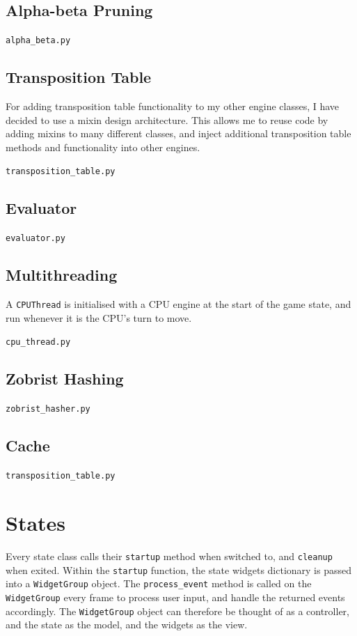 \documentclass[../main/main.tex]{subfiles}
\begin{document}
\subsection{Alpha-beta Pruning}
\label{sec:alpha-beta}
\noindent\verb|alpha_beta.py|


\subsection{Transposition Table}
\label{sec:transposition-table}
For adding transposition table functionality to my other engine classes, I have decided to use a mixin design architecture. This allows me to reuse code by adding mixins to many different classes, and inject additional transposition table methods and functionality into other engines.

\noindent\verb|transposition_table.py|


\subsection{Evaluator}
\noindent\verb|evaluator.py|


\subsection{Multithreading}
A \lstinline{CPUThread} is initialised with a CPU engine at the start of the game state, and run whenever it is the CPU's turn to move.

\noindent\verb|cpu_thread.py|
\label{sec:cpu-thread}


\subsection{Zobrist Hashing}
\label{sec:zobrist-hashing}
\noindent\verb|zobrist_hasher.py|


\subsection{Cache}
\noindent\verb|transposition_table.py|


\section{States}
Every state class calls their \lstinline{startup} method when switched to, and \lstinline{cleanup} when exited. Within the \lstinline{startup} function, the state widgets dictionary is passed into a \lstinline{WidgetGroup} object. The \lstinline{process_event} method is called on the \lstinline{WidgetGroup} every frame to process user input, and handle the returned events accordingly. The \lstinline{WidgetGroup} object can therefore be thought of as a controller, and the state as the model, and the widgets as the view.
\end{document}
